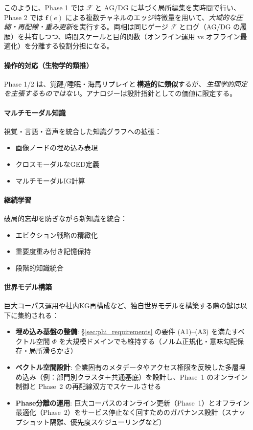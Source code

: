 \documentclass[ja=standard,xelatex]{bxjsarticle}
\newcommand{\F}{\mathcal{F}}
\begin{document}
このように、Phase 1 では $\F$ と AG/DG に基づく局所編集を実時間で行い、Phase 2 では $\mathbf{f}(e)$ による複数チャネルのエッジ特徴量を用いて、\emph{大域的な圧縮・再配線・重み更新}を実行する。両相は同じゲージ $\F$ とログ（AG/DG の履歴）を共有しつつ、時間スケールと目的関数（オンライン運用 vs オフライン最適化）を分離する役割分担になる。

\paragraph{操作的対応（生物学的類推）}
Phase 1/2 は、覚醒/睡眠・海馬リプレイと\,\textbf{構造的に類似}するが、\,\emph{生理学的同定を主張するものではない}。アナロジーは設計指針としての価値に限定する。

\paragraph{マルチモーダル知識}
視覚・言語・音声を統合した知識グラフへの拡張：
\begin{itemize}
  \item 画像ノードの埋め込み表現
  \item クロスモーダルなGED定義
  \item マルチモーダルIG計算
\end{itemize}

\paragraph{継続学習}
破局的忘却を防ぎながら新知識を統合：
\begin{itemize}
  \item エビクション戦略の精緻化
  \item 重要度重み付き記憶保持
  \item 段階的知識統合
\end{itemize}

\paragraph{世界モデル構築}
巨大コーパス運用や社内KG再構成など、独自世界モデルを構築する際の鍵は以下に集約される：
\begin{itemize}
  \item \textbf{埋め込み基盤の整備}: \S\ref{sec:phi_requirements} の要件 (A1)--(A3) を満たすベクトル空間 $\Phi$ を大規模ドメインでも維持する（ノルム正規化・意味勾配保存・局所滑らかさ）
  \item \textbf{ベクトル空間設計}: 企業固有のメタデータやアクセス権限を反映した多層埋め込み（例：部門別クラスタ＋共通基底）を設計し、Phase~1 のオンライン制御と Phase~2 の再配線双方でスケールさせる
  \item \textbf{Phase分離の運用}: 巨大コーパスのオンライン更新（Phase~1）とオフライン最適化（Phase~2）をサービス停止なく回すためのガバナンス設計（スナップショット隔離、優先度スケジューリングなど）
\end{itemize}
\end{document}
